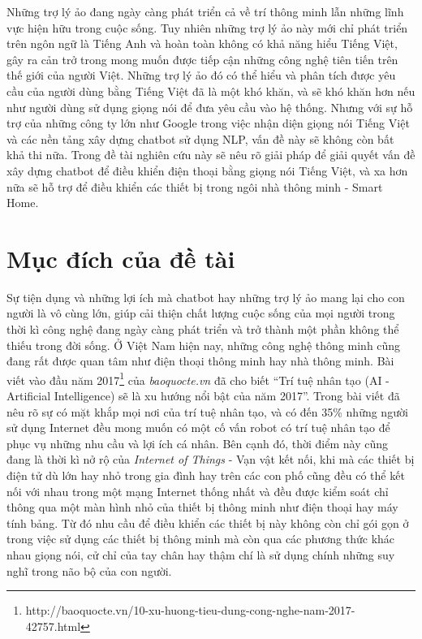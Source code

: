 \documentclass[12pt]{report}
\begin{document}
Những trợ lý ảo đang ngày càng phát triển cả về trí thông minh lẫn những lĩnh vực hiện hữu trong cuộc sống. Tuy nhiên những trợ lý ảo này mới chỉ phát triển trên ngôn ngữ là Tiếng Anh và hoàn toàn không có khả năng hiểu Tiếng Việt, gây ra cản trở trong mong muốn được tiếp cận những công nghệ tiên tiến trên thế giới của người Việt. Những trợ lý ảo đó có thể hiểu và phân tích được yêu cầu của người dùng bằng Tiếng Việt đã là một khó khăn, và sẽ khó khăn hơn nếu như người dùng sử dụng giọng nói để đưa yêu cầu vào hệ thống. Nhưng với sự hỗ trợ của những công ty lớn như Google trong việc nhận diện giọng nói Tiếng Việt và các nền tảng xây dựng chatbot sử dụng NLP, vấn đề này sẽ không còn bất khả thi nữa. Trong đề tài nghiên cứu này sẽ nêu rõ giải pháp để giải quyết vấn đề xây dựng chatbot để điều khiển điện thoại bằng giọng nói Tiếng Việt, và xa hơn nữa sẽ hỗ trợ để điều khiển các thiết bị trong ngôi nhà thông minh - Smart Home.

\section{Mục đích của đề tài}

Sự tiện dụng và những lợi ích mà chatbot hay những trợ lý ảo mang lại cho con người là vô cùng lớn, giúp cải thiện chất lượng cuộc sống của mọi người trong thời kì công nghệ đang ngày càng phát triển và trở thành một phần không thể thiếu trong đời sống. Ở Việt Nam hiện nay, những công nghệ thông minh cũng đang rất được quan tâm như điện thoại thông minh hay nhà thông minh. Bài viết vào đầu năm 2017{\footnote{http://baoquocte.vn/10-xu-huong-tieu-dung-cong-nghe-nam-2017-42757.html}} của \textit{baoquocte.vn} đã cho biết ``Trí tuệ nhân tạo (AI - Artificial Intelligence) sẽ là xu hướng nổi bật của năm 2017''. Trong bài viết đã nêu rõ sự có mặt khắp mọi nơi của trí tuệ nhân tạo, và có đến 35\% những người sử dụng Internet đều mong muốn có một cố vấn robot có trí tuệ nhân tạo để phục vụ những nhu cầu và lợi ích cá nhân. Bên cạnh đó, thời điểm này cũng đang là thời kì nở rộ của \textit{Internet of Things} - Vạn vật kết nối, khi mà các thiết bị điện tử dù lớn hay nhỏ trong gia đình hay trên các con phố cũng đều có thể kết nối với nhau trong một mạng Internet thống nhất và đều được kiểm soát chỉ thông qua một màn hình nhỏ của thiết bị thông minh như điện thoại hay máy tính bảng. Từ đó nhu cầu để điều khiển các thiết bị này không còn chỉ gói gọn ở trong việc sử dụng các thiết bị thông minh mà còn qua các phương thức khác nhau giọng nói, cử chỉ của tay chân hay thậm chí là sử dụng chính những suy nghĩ trong não bộ của con người.
\end{document}
